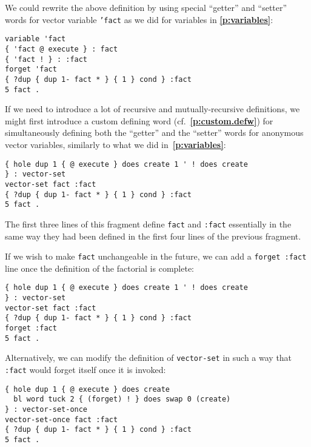 \documentclass[12pt,oneside]{article}
\def\refpoint#1{{\rm\textbf{\ref{#1}}}}
\let\ptref=\refpoint
\begin{document}
We could rewrite the above definition by using special ``getter'' and ``setter'' words for vector variable {\tt 'fact} as we did for variables in \ptref{p:variables}:
\begin{verbatim}
variable 'fact
{ 'fact @ execute } : fact
{ 'fact ! } : :fact
forget 'fact
{ ?dup { dup 1- fact * } { 1 } cond } :fact
5 fact .
\end{verbatim}
If we need to introduce a lot of recursive and mutually-recursive definitions, we might first introduce a custom defining word (cf.~\ptref{p:custom.defw}) for simultaneously defining both the ``getter'' and the ``setter'' words for anonymous vector variables, similarly to what we did in~\ptref{p:variables}:
\begin{verbatim}
{ hole dup 1 { @ execute } does create 1 ' ! does create
} : vector-set
vector-set fact :fact
{ ?dup { dup 1- fact * } { 1 } cond } :fact
5 fact .
\end{verbatim}
The first three lines of this fragment define {\tt fact} and {\tt :fact} essentially in the same way they had been defined in the first four lines of the previous fragment.

If we wish to make {\tt fact} unchangeable in the future, we can add a {\tt forget :fact} line once the definition of the factorial is complete:
\begin{verbatim}
{ hole dup 1 { @ execute } does create 1 ' ! does create
} : vector-set
vector-set fact :fact
{ ?dup { dup 1- fact * } { 1 } cond } :fact
forget :fact
5 fact .
\end{verbatim}
Alternatively, we can modify the definition of {\tt vector-set} in such a way that {\tt :fact} would forget itself once it is invoked:
\begin{verbatim}
{ hole dup 1 { @ execute } does create
  bl word tuck 2 { (forget) ! } does swap 0 (create)
} : vector-set-once
vector-set-once fact :fact
{ ?dup { dup 1- fact * } { 1 } cond } :fact
5 fact .
\end{verbatim}
\end{document}
